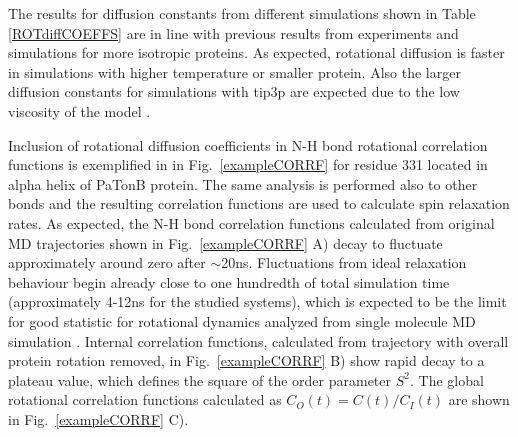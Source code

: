\documentclass[pre,aps,floatfix,authordate1-4,twocolumn]{revtex4-1}
\begin{document}
The results for diffusion constants
from different simulations shown in Table \ref{ROTdiffCOEFFS}
are in line with previous results from experiments \cite{??} and
simulations \cite{??} for more isotropic proteins. As expected,
rotational diffusion is faster in simulations with higher temperature
or smaller protein. Also the larger diffusion constants for simulations
with tip3p are expected due to the low viscosity of the model \cite{??}.

Inclusion of rotational diffusion coefficients in N-H bond
rotational correlation functions is exemplified in in Fig.~\ref{exampleCORRF}
for residue 331 located in alpha helix of PaTonB protein. 
The same analysis is performed also to other bonds and the resulting
correlation functions are used to calculate spin relaxation rates.
As expected, the N-H bond correlation functions calculated from original MD trajectories
shown in Fig.~\ref{exampleCORRF} A)  decay to fluctuate approximately around zero
after $\sim$20ns. Fluctuations from
ideal relaxation behaviour begin already close to one
hundredth of total simulation time (approximately 4-12ns for the studied systems),
which is expected to be the limit for good
statistic for rotational dynamics analyzed from single molecule MD simulation \cite{??}.
Internal correlation functions, calculated from trajectory with overall protein rotation removed,
in Fig.~\ref{exampleCORRF} B) show rapid decay to a plateau value, which defines the square of the order
parameter $S^2$. The global rotational correlation functions calculated as $C_O(t)=C(t)/C_I(t)$
are shown in Fig.~\ref{exampleCORRF} C). 
\end{document}
